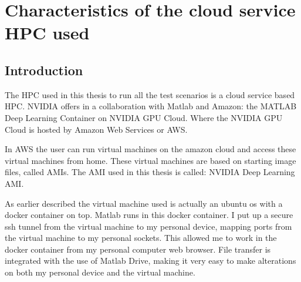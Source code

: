 \chapter{Characteristics of the cloud service HPC used}
\section{Introduction}
The HPC used in this thesis to run all the test scenarios is a cloud service based HPC.
NVIDIA offers in a collaboration with Matlab and Amazon: the MATLAB Deep Learning Container on NVIDIA GPU Cloud.
Where the NVIDIA GPU Cloud is hosted by Amazon Web Services or AWS.
\par 
In AWS the user can run virtual machines on the amazon cloud and access these virtual machines from home.
These virtual machines are based on starting image files, called AMIs.
The AMI used in this thesis is called: NVIDIA Deep Learning AMI.
\par
As earlier described the virtual machine used is actually an ubuntu os with a docker container on top.
Matlab runs in this docker container.
I put up a secure ssh tunnel from the virtual machine to my personal device, mapping ports from the virtual machine to my personal sockets.
This allowed me to work in the docker container from my personal computer web browser.
File transfer is integrated with the use of Matlab Drive, making it very easy to make alterations on both my personal device and the virtual machine.
